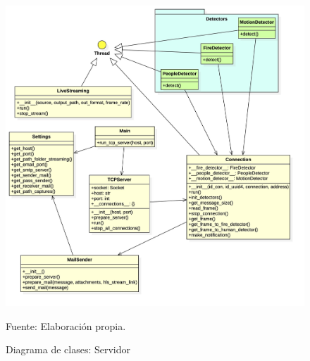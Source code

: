 \begin{figure}[H]
    \begin{center}
        \includegraphics[width=18cm]{img/capitulo_4/tcpserver.jpg}
    \end{center}
    \begin{center}
        \caption{Diagrama de clases: Servidor}
        Fuente: Elaboración propia.
        \label{fig:diag_clases_server}
    \end{center}
\end{figure}

